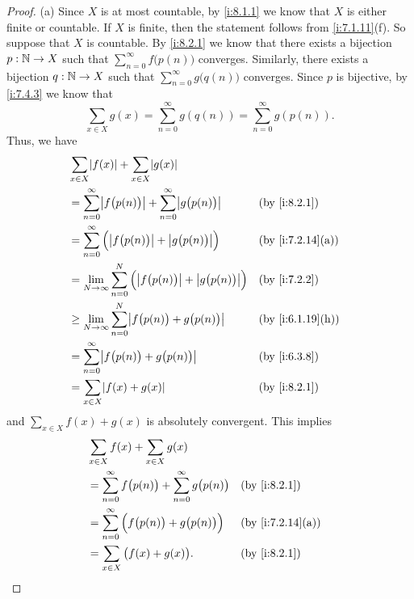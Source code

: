 \begin{proof}{(a)}
  Since \(X\) is at most countable, by \cref{i:8.1.1} we know that \(X\) is either finite or countable.
  If \(X\) is finite, then the statement follows from \cref{i:7.1.11}(f).
  So suppose that \(X\) is countable.
  By \cref{i:8.2.1} we know that there exists a bijection \(p : \mathbb{N} \to X\) such that \(\sum_{n = 0}^\infty f\big(p(n)\big)\) converges.
  Similarly, there exists a bijection \(q : \mathbb{N} \to X\) such that \(\sum_{n = 0}^\infty g\big(q(n)\big)\) converges.
  Since \(p\) is bijective, by \cref{i:7.4.3} we know that
  \[
    \sum_{x \in X} g(x) = \sum_{n = 0}^\infty g(q(n)) = \sum_{n = 0}^\infty g(p(n)).
  \]
  Thus, we have
  \begin{align*}
     & \sum_{x \in X} \abs{f(x)} + \sum_{x \in X} \abs{g(x)}                                                              \\
     & = \sum_{n = 0}^\infty \abs{f\big(p(n)\big)} + \sum_{n = 0}^\infty \abs{g\big(p(n)\big)}      &  & \by{i:8.2.1}     \\
     & = \sum_{n = 0}^\infty \Big(\abs{f\big(p(n)\big)} + \abs{g\big(p(n)\big)}\Big)                &  & \by{i:7.2.14}[a] \\
     & = \lim_{N \to \infty} \sum_{n = 0}^N \Big(\abs{f\big(p(n)\big)} + \abs{g\big(p(n)\big)}\Big) &  & \by{i:7.2.2}     \\
     & \geq \lim_{N \to \infty} \sum_{n = 0}^N \abs{f\big(p(n)\big) + g\big(p(n)\big)}              &  & \by{i:6.1.19}[h] \\
     & = \sum_{n = 0}^\infty \abs{f\big(p(n)\big) + g\big(p(n)\big)}                                &  & \by{i:6.3.8}     \\
     & = \sum_{x \in X} \abs{f(x) + g(x)}                                                           &  & \by{i:8.2.1}
  \end{align*}
  and \(\sum_{x \in X} f(x) + g(x)\) is absolutely convergent.
  This implies
  \begin{align*}
     & \sum_{x \in X} f(x) + \sum_{x \in X} g(x)                                                         \\
     & = \sum_{n = 0}^\infty f\big(p(n)\big) + \sum_{n = 0}^\infty g\big(p(n)\big) &  & \by{i:8.2.1}     \\
     & = \sum_{n = 0}^\infty \Big(f\big(p(n)\big) + g\big(p(n)\big)\Big)           &  & \by{i:7.2.14}[a] \\
     & = \sum_{x \in X} \big(f(x) + g(x)\big).                                     &  & \by{i:8.2.1}
  \end{align*}
\end{proof}

